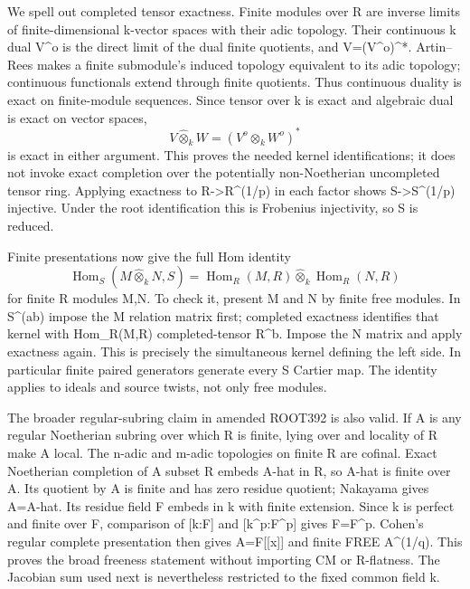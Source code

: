 \documentclass[11pt]{article}
\begin{document}
We spell out completed tensor exactness. Finite modules over R are inverse limits of finite-dimensional k-vector spaces with their adic topology. Their continuous k dual V\textasciicircum{}o is the direct limit of the dual finite quotients, and V=(V\textasciicircum{}o)\textasciicircum{}*. Artin--Rees makes a finite submodule's induced topology equivalent to its adic topology; continuous functionals extend through finite quotients. Thus continuous duality is exact on finite-module sequences. Since tensor over k is exact and algebraic dual is exact on vector spaces,
\[
V\widehat\otimes_k W=(V^o\otimes_k W^o)^*
\]
is exact in either argument. This proves the needed kernel identifications; it does not invoke exact completion over the potentially non-Noetherian uncompleted tensor ring. Applying exactness to R->R\textasciicircum{}(1/p) in each factor shows S->S\textasciicircum{}(1/p) injective. Under the root identification this is Frobenius injectivity, so S is reduced.

Finite presentations now give the full Hom identity
\[
\operatorname{Hom}_S(M\widehat\otimes_k N,S)
=\operatorname{Hom}_R(M,R)\widehat\otimes_k\operatorname{Hom}_R(N,R)
\]
for finite R modules M,N. To check it, present M and N by finite free modules. In S\textasciicircum{}(ab) impose the M relation matrix first; completed exactness identifies that kernel with Hom\_R(M,R) completed-tensor R\textasciicircum{}b. Impose the N matrix and apply exactness again. This is precisely the simultaneous kernel defining the left side. In particular finite paired generators generate every S Cartier map. The identity applies to ideals and source twists, not only free modules.

The broader regular-subring claim in amended ROOT392 is also valid. If A is any regular Noetherian subring over which R is finite, lying over and locality of R make A local. The n-adic and m-adic topologies on finite R are cofinal. Exact Noetherian completion of A subset R embeds A-hat in R, so A-hat is finite over A. Its quotient by A is finite and has zero residue quotient; Nakayama gives A=A-hat. Its residue field F embeds in k with finite extension. Since k is perfect and finite over F, comparison of [k:F] and [k\textasciicircum{}p:F\textasciicircum{}p] gives F=F\textasciicircum{}p. Cohen's regular complete presentation then gives A=F[[x]] and finite FREE A\textasciicircum{}(1/q). This proves the broad freeness statement without importing CM or R-flatness. The Jacobian sum used next is nevertheless restricted to the fixed common field k.
\end{document}
